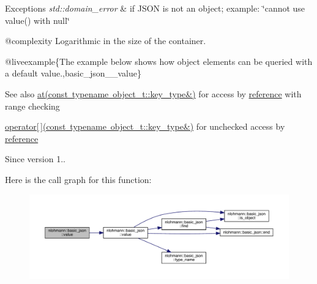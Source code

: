 \begin{DoxyExceptions}{Exceptions}
{\em std\+::domain\+\_\+error} & if J\+S\+ON is not an object; example\+: {\ttfamily \char`\"{}cannot use
value() with null\char`\"{}}\\
\hline
\end{DoxyExceptions}
@complexity Logarithmic in the size of the container.

@liveexample\{The example below shows how object elements can be queried with a default value.,basic\+\_\+json\+\_\+\+\_\+value\}

\begin{DoxySeeAlso}{See also}
\mbox{\hyperlink{classnlohmann_1_1basic__json_a93403e803947b86f4da2d1fb3345cf2c}{at(const typename object\+\_\+t\+::key\+\_\+type\&)}} for access by \mbox{\hyperlink{classnlohmann_1_1basic__json_ac6a5eddd156c776ac75ff54cfe54a5bc}{reference}} with range checking 

\mbox{\hyperlink{classnlohmann_1_1basic__json_a233b02b0839ef798942dd46157cc0fe6}{operator\mbox{[}$\,$\mbox{]}(const typename object\+\_\+t\+::key\+\_\+type\&)}} for unchecked access by \mbox{\hyperlink{classnlohmann_1_1basic__json_ac6a5eddd156c776ac75ff54cfe54a5bc}{reference}}
\end{DoxySeeAlso}
\begin{DoxySince}{Since}
version 1.. 
\end{DoxySince}
Here is the call graph for this function\+:
\nopagebreak
\begin{figure}[H]
\begin{center}
\leavevmode
\includegraphics[width=350pt]{classnlohmann_1_1basic__json_ad6a18403e7fbac9c4efd06facc71fc88_cgraph}
\end{center}
\end{figure}
\mbox{\label{classnlohmann_1_1basic__json_ab7df4291dda0a80d86f74427cc3993ba}} 
